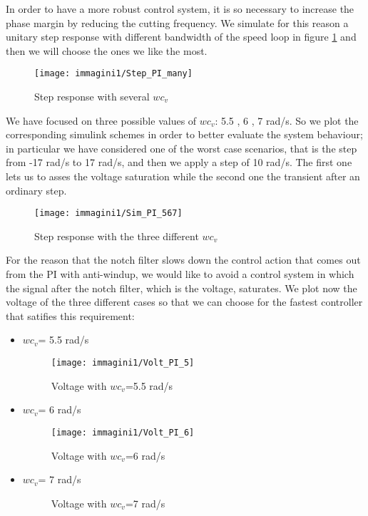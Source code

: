 \par
In order to have a more robust control system, it is so necessary to increase the phase margin by reducing the cutting frequency. We simulate for this reason a unitary step response with different bandwidth of the speed loop in figure \ref{fig:Step with many wc} and then we will choose the ones we like the most.
\begin{figure}[h]
	\centering
	\texttt{[image: immagini1/Step\_PI\_many]}
	\caption{Step response with several $wc_{v} $}
	\label{fig:Step with many wc}
\end{figure}
\newline We have focused on three possible values of $wc_{v} $: 5.5 , 6 , 7 rad/s.
So we plot the corresponding simulink schemes in order to better evaluate the system behaviour; in particular we have considered one of the worst case scenarios, that is the step from -17 rad/s to 17 rad/s, and then we apply a step of 10 rad/s. The first one lets us to asses the voltage saturation while the second one the transient after an ordinary step.
\begin{figure}[h]
	\centering
	\texttt{[image: immagini1/Sim\_PI\_567]}
	\caption{Step response with the three different $wc_{v} $}
\end{figure}
\par For the reason that the notch filter slows down the control action that comes out from the PI with anti-windup, we would like to avoid a control system in which the signal after the notch filter, which is the voltage, saturates. We plot now the voltage of the three different cases so that we can choose for the fastest controller that satifies this requirement: 
\begin{itemize}
	\item $wc_{v} $= 5.5 rad/s
	\begin{figure}[h]
		\centering
		\texttt{[image: immagini1/Volt\_PI\_5]}
		\caption{Voltage with $wc_{v} $=5.5 rad/s}
	\end{figure}
	
	\item $wc_{v} $= 6 rad/s 
	\begin{figure}[h]
		\centering
		\texttt{[image: immagini1/Volt\_PI\_6]}
		\caption{Voltage with $wc_{v} $=6 rad/s}
	\end{figure}
	\item $wc_{v} $= 7 rad/s
	\\
	\begin{figure}[h]
		\centering
		\quad
		\caption{Voltage with $wc_{v} $=7 rad/s}
	\end{figure}
\end{itemize}

